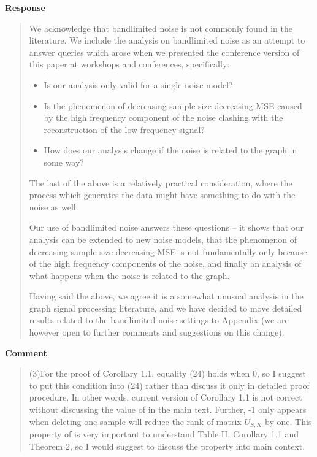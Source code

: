 \documentclass[11pt,onecolumn,journal]{IEEEtran}
\theoremstyle{definition}
\begin{document}
\textbf{Response}
\begin{quote}
We acknowledge that bandlimited noise is not commonly found in the literature. We include the analysis on bandlimited noise as an attempt to answer queries which arose when we presented the conference version of this paper at workshops and conferences, specifically:
\begin{itemize}
    \item Is our analysis only valid for a single noise model?
    \item Is the phenomenon of decreasing sample size decreasing MSE caused by the high frequency component of the noise clashing with the reconstruction of the low frequency signal?
    \item How does our analysis change if the noise is related to the graph in some way?
\end{itemize}
The last of the above is a relatively practical consideration, where the process which generates the data might have something to do with the noise as well.

Our use of bandlimited noise answers these questions -- it shows that our analysis can be extended to new noise models, that the phenomenon of decreasing sample size decreasing MSE is not fundamentally only because of the high frequency components of the noise, and finally an analysis of what happens when the noise is related to the graph.

Having said the above, we agree it is a somewhat unusual analysis in the graph signal processing literature, and we have decided to move detailed results related to the bandlimited noise settings to Appendix (we are however open to further
comments and suggestions on this change).
\end{quote}

\textbf{Comment}
\begin{quote}
(3)For the proof of Corollary 1.1, equality (24) holds when 0, so I suggest to put this condition into (24) rather than discuss it only in detailed proof procedure. In other words, current version of Corollary 1.1 is not correct without discussing the value of  in the main text. Further, -1 only appears when deleting one sample will reduce the rank of matrix $U_{S,K}$ by one. This property of is very important to understand Table II, Corollary 1.1 and Theorem 2, so I would suggest to discuss the property into main context.
\end{quote}
\end{document}
